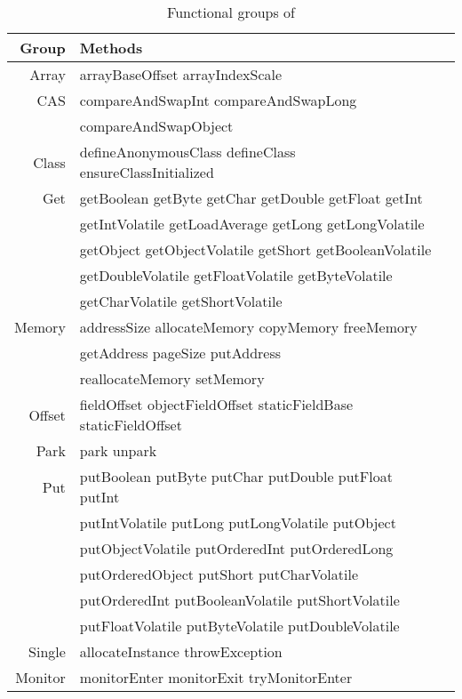 
\begin{table}[ht]
\centering
\caption{Functional groups of \smu{}}
\label{table:groups}
\begin{tabular}{|r|l|l|} \hline
Group  & Methods \\ \hline \hline
Array  & arrayBaseOffset arrayIndexScale \\ \hline
CAS    & compareAndSwapInt compareAndSwapLong \\
       & compareAndSwapObject \\ \hline
Class  & defineAnonymousClass defineClass ensureClassInitialized \\ \hline
Get    & getBoolean getByte getChar getDouble getFloat getInt \\
       & getIntVolatile getLoadAverage getLong getLongVolatile \\
       & getObject getObjectVolatile getShort getBooleanVolatile \\
       & getDoubleVolatile getFloatVolatile getByteVolatile \\
       & getCharVolatile getShortVolatile \\ \hline
Memory & addressSize allocateMemory copyMemory freeMemory \\
       & getAddress pageSize putAddress \\ 
       & reallocateMemory setMemory \\ \hline
Offset & fieldOffset objectFieldOffset staticFieldBase staticFieldOffset \\ \hline
Park   & park unpark \\ \hline
Put    & putBoolean putByte putChar putDouble putFloat putInt \\
       & putIntVolatile putLong putLongVolatile putObject \\
       & putObjectVolatile putOrderedInt putOrderedLong \\
       & putOrderedObject putShort putCharVolatile \\ 
       & putOrderedInt putBooleanVolatile putShortVolatile \\ 
       & putFloatVolatile putByteVolatile putDoubleVolatile \\ \hline
Single & allocateInstance throwException \\ \hline
Monitor & monitorEnter monitorExit tryMonitorEnter \\ \hline

\end{tabular}
\end{table}



